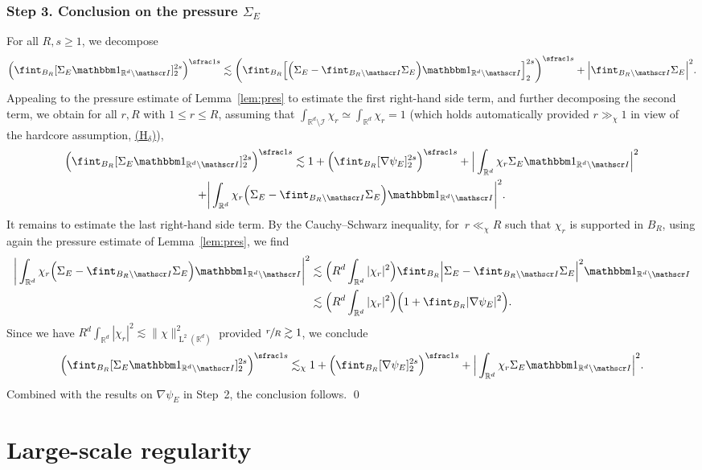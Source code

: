 \documentclass[10pt]{amsart}
\let\mathcal\mathscr
\newcounter{assumption}
\newcommand{\Hd}{\hyperref[Hd]{\textup{(H$_\delta$)}}\xspace}
\let\mathds\mathbbm
\theoremstyle{plain}
\theoremstyle{definition}
\newcommand{\R}{\mathbb R}
\newcommand{\Ic}{\mathcal I}
\newcommand{\Ld}{\operatorname{L}}
\newcommand{\step}[1]{\subsubsection*{Step #1}}
\begin{document}
\step{3. Conclusion on the pressure $\Sigma_E$}
For all $R,s\ge1$,
we decompose
\begin{equation*}
\Big(\fint_{B_R}[\Sigma_E\mathds1_{\R^d\setminus\Ic}]_2^{2s}\Big)^{\sfrac1s}\lesssim 
\bigg(\fint_{B_R}\Big[\Big(\Sigma_E-\fint_{B_R\setminus\Ic}\Sigma_E\Big)\mathds1_{\R^d\setminus\Ic}\Big]_2^{2s}\bigg)^{\sfrac1s}+\Big|\fint_{B_R\setminus\Ic}\Sigma_E\Big|^2.
\end{equation*}
Appealing to the pressure estimate of Lemma~\ref{lem:pres} to estimate the first right-hand side term,
and further decomposing the second term, we obtain for all $r,R$ with $1\le r\le R$, assuming that $\int_{\R^d\setminus\Ic}\chi_r\simeq\int_{\R^d}\chi_r=1$ (which holds automatically provided $r\gg_\chi1$ in view of the hardcore assumption, \cf \Hd),
\begin{multline*}
\Big(\fint_{B_R}[\Sigma_E\mathds1_{\R^d\setminus\Ic}]_2^{2s}\Big)^{\sfrac1s}\lesssim 1+
\Big(\fint_{B_R}[\nabla\psi_E]_2^{2s}\Big)^{\sfrac1s}+\Big|\int_{\R^d}\chi_r\Sigma_E\mathds1_{\R^d\setminus\Ic}\Big|^2\\
+\bigg|\int_{\R^d}\chi_r\Big(\Sigma_E-\fint_{B_R\setminus\Ic}\Sigma_E\Big)\mathds1_{\R^d\setminus\Ic}\bigg|^2.
\end{multline*}
It remains to estimate the last right-hand side term. By the Cauchy--Schwarz inequality, for~$r\ll_\chi R$ such that $\chi_r$ is supported in $B_R$, using again the pressure estimate of Lemma~\ref{lem:pres}, we find
\begin{align*}
\bigg|\int_{\R^d}\chi_r\Big(\Sigma_E-\fint_{B_R\setminus\Ic}\Sigma_E\Big)\mathds1_{\R^d\setminus\Ic}\bigg|^2&\lesssim \Big(R^d\int_{\R^d}|\chi_r|^2\Big)\fint_{B_R}\Big|\Sigma_E-\fint_{B_R\setminus\Ic}\Sigma_E\Big|^2\mathds1_{\R^d\setminus\Ic}\\
&\lesssim \Big(R^d\int_{\R^d}|\chi_r|^2\Big)\Big(1+\fint_{B_R}|\nabla\psi_E|^2\Big).
\end{align*}
Since we have $R^d\int_{\R^d}|\chi_r|^2\lesssim\|\chi\|_{\Ld^2(\R^d)}^2$ provided $\sfrac rR\gtrsim1$, we conclude
\begin{equation*}
\Big(\fint_{B_R}[\Sigma_E\mathds1_{\R^d\setminus\Ic}]_2^{2s}\Big)^{\sfrac1s}\lesssim_\chi 1+
\Big(\fint_{B_{R}}[\nabla\psi_E]_2^{2s}\Big)^{\sfrac1s}+\Big|\int_{\R^d}\chi_r\Sigma_E\mathds1_{\R^d\setminus\Ic}\Big|^2.
\end{equation*}
Combined with the results on $\nabla\psi_E$ in Step~2, the conclusion follows.
\qed

\section{Large-scale regularity}\label{sec:reg}
\end{document}
